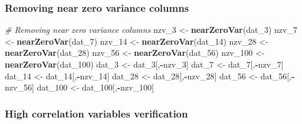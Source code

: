 \documentclass[
]{article}
\newenvironment{Shaded}{\begin{snugshade}}{\end{snugshade}}
\newcommand{\CommentTok}[1]{\textcolor[rgb]{0.56,0.35,0.01}{\textit{#1}}}
\newcommand{\DecValTok}[1]{\textcolor[rgb]{0.00,0.00,0.81}{#1}}
\newcommand{\KeywordTok}[1]{\textcolor[rgb]{0.13,0.29,0.53}{\textbf{#1}}}
\newcommand{\NormalTok}[1]{#1}
\newcommand{\OperatorTok}[1]{\textcolor[rgb]{0.81,0.36,0.00}{\textbf{#1}}}
\newcommand{\StringTok}[1]{\textcolor[rgb]{0.31,0.60,0.02}{#1}}
\begin{document}
\hypertarget{removing-near-zero-variance-columns}{%
\subsubsection{Removing near zero variance
columns}\label{removing-near-zero-variance-columns}}

\label{show-nzv}

\begin{Shaded}
\begin{Highlighting}[]
\CommentTok{# Removing near zero variance columns}
\NormalTok{nzv_}\DecValTok{3}\NormalTok{ <-}\StringTok{ }\KeywordTok{nearZeroVar}\NormalTok{(dat_}\DecValTok{3}\NormalTok{)}
\NormalTok{nzv_}\DecValTok{7}\NormalTok{ <-}\StringTok{ }\KeywordTok{nearZeroVar}\NormalTok{(dat_}\DecValTok{7}\NormalTok{)}
\NormalTok{nzv_}\DecValTok{14}\NormalTok{ <-}\StringTok{ }\KeywordTok{nearZeroVar}\NormalTok{(dat_}\DecValTok{14}\NormalTok{)}
\NormalTok{nzv_}\DecValTok{28}\NormalTok{ <-}\StringTok{ }\KeywordTok{nearZeroVar}\NormalTok{(dat_}\DecValTok{28}\NormalTok{)}
\NormalTok{nzv_}\DecValTok{56}\NormalTok{ <-}\StringTok{ }\KeywordTok{nearZeroVar}\NormalTok{(dat_}\DecValTok{56}\NormalTok{)}
\NormalTok{nzv_}\DecValTok{100}\NormalTok{ <-}\StringTok{ }\KeywordTok{nearZeroVar}\NormalTok{(dat_}\DecValTok{100}\NormalTok{)}
\NormalTok{dat_}\DecValTok{3}\NormalTok{ <-}\StringTok{ }\NormalTok{dat_}\DecValTok{3}\NormalTok{[,}\OperatorTok{-}\NormalTok{nzv_}\DecValTok{3}\NormalTok{]}
\NormalTok{dat_}\DecValTok{7}\NormalTok{ <-}\StringTok{ }\NormalTok{dat_}\DecValTok{7}\NormalTok{[,}\OperatorTok{-}\NormalTok{nzv_}\DecValTok{7}\NormalTok{]}
\NormalTok{dat_}\DecValTok{14}\NormalTok{ <-}\StringTok{ }\NormalTok{dat_}\DecValTok{14}\NormalTok{[,}\OperatorTok{-}\NormalTok{nzv_}\DecValTok{14}\NormalTok{]}
\NormalTok{dat_}\DecValTok{28}\NormalTok{ <-}\StringTok{ }\NormalTok{dat_}\DecValTok{28}\NormalTok{[,}\OperatorTok{-}\NormalTok{nzv_}\DecValTok{28}\NormalTok{]}
\NormalTok{dat_}\DecValTok{56}\NormalTok{ <-}\StringTok{ }\NormalTok{dat_}\DecValTok{56}\NormalTok{[,}\OperatorTok{-}\NormalTok{nzv_}\DecValTok{56}\NormalTok{]}
\NormalTok{dat_}\DecValTok{100}\NormalTok{ <-}\StringTok{ }\NormalTok{dat_}\DecValTok{100}\NormalTok{[,}\OperatorTok{-}\NormalTok{nzv_}\DecValTok{100}\NormalTok{]}
\end{Highlighting}
\end{Shaded}

\hypertarget{high-correlation-variables-verification}{%
\subsubsection{High correlation variables
verification}\label{high-correlation-variables-verification}}
\end{document}
